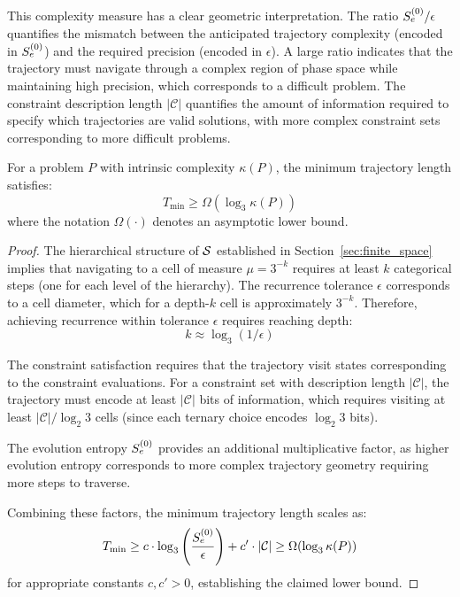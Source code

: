 This complexity measure has a clear geometric interpretation. The ratio $S_e^{(0)}/\epsilon$ quantifies the mismatch between the anticipated trajectory complexity (encoded in $S_e^{(0)}$) and the required precision (encoded in $\epsilon$). A large ratio indicates that the trajectory must navigate through a complex region of phase space while maintaining high precision, which corresponds to a difficult problem. The constraint description length $|\mathcal{C}|$ quantifies the amount of information required to specify which trajectories are valid solutions, with more complex constraint sets corresponding to more difficult problems.



\begin{proposition}
\label{prop:complexity_bounds}
For a problem $P$ with intrinsic complexity $\kappa(P)$, the minimum trajectory length satisfies:
\begin{equation}
T_{\min} \geq \Omega\left( \log_3 \kappa(P) \right)
\label{eq:complexity_lower_bound}
\end{equation}
where the notation $\Omega(\cdot)$ denotes an asymptotic lower bound.
\end{proposition}

\begin{proof}
The hierarchical structure of $\mathcal{S}$ established in Section~\ref{sec:finite_space} implies that navigating to a cell of measure $\mu = 3^{-k}$ requires at least $k$ categorical steps (one for each level of the hierarchy). The recurrence tolerance $\epsilon$ corresponds to a cell diameter, which for a depth-$k$ cell is approximately $3^{-k}$. Therefore, achieving recurrence within tolerance $\epsilon$ requires reaching depth:
\begin{equation}
k \approx \log_3(1/\epsilon)
\end{equation}

The constraint satisfaction requires that the trajectory visit states corresponding to the constraint evaluations. For a constraint set with description length $|\mathcal{C}|$, the trajectory must encode at least $|\mathcal{C}|$ bits of information, which requires visiting at least $|\mathcal{C}|/\log_2 3$ cells (since each ternary choice encodes $\log_2 3$ bits).

The evolution entropy $S_e^{(0)}$ provides an additional multiplicative factor, as higher evolution entropy corresponds to more complex trajectory geometry requiring more steps to traverse.

Combining these factors, the minimum trajectory length scales as:
\begin{equation}
T_{\min} \geq c \cdot \log_3\left(\frac{S_e^{(0)}}{\epsilon}\right) + c' \cdot |\mathcal{C}| \geq \Omega(\log_3 \kappa(P))
\end{equation}
for appropriate constants $c, c' > 0$, establishing the claimed lower bound.
\end{proof}

